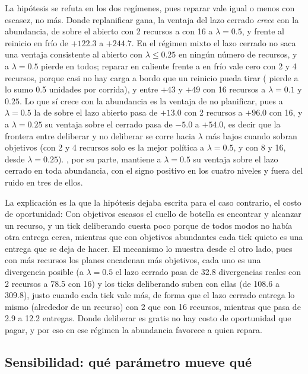 La hipótesis se refuta en los dos regímenes, pues reparar vale igual o menos con escasez, no más. Donde replanificar gana, la ventaja del lazo cerrado \emph{crece} con la abundancia, de  sobre el abierto con 2 recursos a  con 16 a $\lambda=0.5$, y frente al reinicio en frío de $+122.3$ a $+244.7$. En el régimen mixto el lazo cerrado no saca una ventaja consistente al abierto con $\lambda\le0.25$ en ningún número de recursos, y a $\lambda=0.5$ pierde en todos; reparar en caliente frente a en frío vale cero con 2 y 4 recursos, porque casi no hay carga a bordo que un reinicio pueda tirar (\CR{} pierde a lo sumo 0.5 unidades por corrida), y entre $+43$ y $+49$ con 16 recursos a $\lambda=0.1$ y $0.25$. Lo que sí crece con la abundancia es la ventaja de no planificar, pues a $\lambda=0.5$ la de \MB{} sobre el lazo abierto pasa de $+13.0$ con 2 recursos a $+96.0$ con 16, y a $\lambda=0.25$ su ventaja sobre el cerrado pasa de $-5.0$ a $+54.0$, es decir que la frontera entre deliberar y no deliberar se corre hacia $\lambda$ más bajos cuando sobran objetivos (con 2 y 4 recursos \MB{} solo es la mejor política a $\lambda=0.5$, y con 8 y 16, desde $\lambda=0.25$). \KB, por su parte, mantiene a $\lambda=0.5$ su ventaja sobre el lazo cerrado en toda abundancia, con el signo positivo en los cuatro niveles y fuera del ruido en tres de ellos.

La explicación es la que la hipótesis dejaba escrita para el caso contrario, el costo de oportunidad: Con objetivos escasos el cuello de botella es encontrar y alcanzar un recurso, y un tick deliberando cuesta poco porque de todos modos no había otra entrega cerca, mientras que con objetivos abundantes cada tick quieto es una entrega que se deja de hacer. El mecanismo lo muestra desde el otro lado, pues con más recursos los planes encadenan más objetivos, cada uno es una divergencia posible (a $\lambda=0.5$ el lazo cerrado pasa de 32.8 divergencias reales con 2 recursos a 78.5 con 16) y los ticks deliberando suben con ellas (de 108.6 a 309.8), justo cuando cada tick vale más, de forma que el lazo cerrado entrega lo mismo (alrededor de un recurso) con 2 que con 16 recursos, mientras que \MB{} pasa de 2.9 a 12.2 entregas. Donde deliberar es gratis no hay costo de oportunidad que pagar, y por eso en ese régimen la abundancia favorece a quien repara.

\FloatBarrier
\subsection{Sensibilidad: qué parámetro mueve qué}\label{sec:res-sensibilidad}

